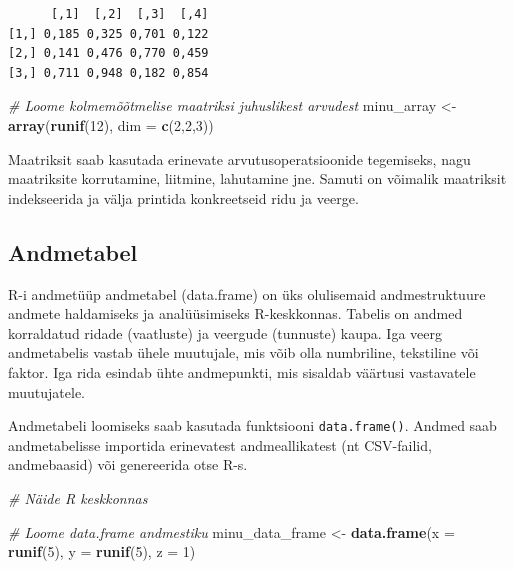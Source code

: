 \documentclass[
]{book}
\newenvironment{Shaded}{\begin{snugshade}}{\end{snugshade}}
\newcommand{\AttributeTok}[1]{\textcolor[rgb]{0.13,0.29,0.53}{#1}}
\newcommand{\CommentTok}[1]{\textcolor[rgb]{0.56,0.35,0.01}{\textit{#1}}}
\newcommand{\DecValTok}[1]{\textcolor[rgb]{0.00,0.00,0.81}{#1}}
\newcommand{\FunctionTok}[1]{\textcolor[rgb]{0.13,0.29,0.53}{\textbf{#1}}}
\newcommand{\NormalTok}[1]{#1}
\newcommand{\OtherTok}[1]{\textcolor[rgb]{0.56,0.35,0.01}{#1}}
\renewenvironment{Shaded} {\begin{snugshade}\footnotesize} {\end{snugshade}}
\begin{document}
\begin{verbatim}
      [,1]  [,2]  [,3]  [,4]
[1,] 0,185 0,325 0,701 0,122
[2,] 0,141 0,476 0,770 0,459
[3,] 0,711 0,948 0,182 0,854
\end{verbatim}

\begin{Shaded}
\begin{Highlighting}[]
\CommentTok{\# Loome kolmemõõtmelise maatriksi juhuslikest arvudest}
\NormalTok{minu\_array }\OtherTok{\textless{}{-}} \FunctionTok{array}\NormalTok{(}\FunctionTok{runif}\NormalTok{(}\DecValTok{12}\NormalTok{), }\AttributeTok{dim =} \FunctionTok{c}\NormalTok{(}\DecValTok{2}\NormalTok{,}\DecValTok{2}\NormalTok{,}\DecValTok{3}\NormalTok{))}
\end{Highlighting}
\end{Shaded}

Maatriksit saab kasutada erinevate arvutusoperatsioonide tegemiseks, nagu maatriksite korrutamine, liitmine, lahutamine jne. Samuti on võimalik maatriksit indekseerida ja välja printida konkreetseid ridu ja veerge.

\subsection{Andmetabel}\label{andmetabel}

R-i andmetüüp andmetabel (data.frame) on üks olulisemaid andmestruktuure andmete haldamiseks ja analüüsimiseks R-keskkonnas. Tabelis on andmed korraldatud ridade (vaatluste) ja veergude (tunnuste) kaupa. Iga veerg andmetabelis vastab ühele muutujale, mis võib olla numbriline, tekstiline või faktor. Iga rida esindab ühte andmepunkti, mis sisaldab väärtusi vastavatele muutujatele.

Andmetabeli loomiseks saab kasutada funktsiooni \texttt{data.frame()}. Andmed saab andmetabelisse importida erinevatest andmeallikatest (nt CSV-failid, andmebaasid) või genereerida otse R-s.

\begin{Shaded}
\begin{Highlighting}[]
\CommentTok{\# Näide R keskkonnas}

\CommentTok{\# Loome data.frame andmestiku}
\NormalTok{minu\_data\_frame }\OtherTok{\textless{}{-}} \FunctionTok{data.frame}\NormalTok{(}\AttributeTok{x =} \FunctionTok{runif}\NormalTok{(}\DecValTok{5}\NormalTok{), }\AttributeTok{y =} \FunctionTok{runif}\NormalTok{(}\DecValTok{5}\NormalTok{), }\AttributeTok{z =} \DecValTok{1}\NormalTok{)}
\end{Highlighting}
\end{Shaded}
\end{document}
